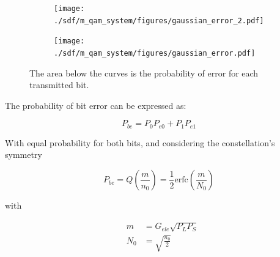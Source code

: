 \begin{figure}[H]
	\centering
	\begin{subfigure}{.5\textwidth}
		\centering
		\texttt{[image: ./sdf/m\_qam\_system/figures/gaussian\_error\_2.pdf]}
	\end{subfigure}%
	\begin{subfigure}{.5\textwidth}
		\centering
		\texttt{[image: ./sdf/m\_qam\_system/figures/gaussian\_error.pdf]}
	\end{subfigure}
	\caption{The area below the curves is the probability of error for each transmitted bit.}
	\label{fig:gausserr}
\end{figure}

The probability of bit error can be expressed as:

\begin{equation}
P_{be} = P_0 P_{e0} + P_1 P_{e1}
\end{equation}

With equal probability for both bits, and considering the constellation's symmetry

\begin{equation}\label{eq:berMQAM}
P_{be} =  Q\left({\frac{m}{n_0}}\right) = \frac{1}{2} \text{erfc}\left({\frac{m}{N_0}}\right)
\end{equation}





with


\begin{eqnarray}
&m &= G_{ele} \sqrt{P_L P_S} \\
&N_0 &= \sqrt{\frac{n_0}{2}}
\end{eqnarray}


